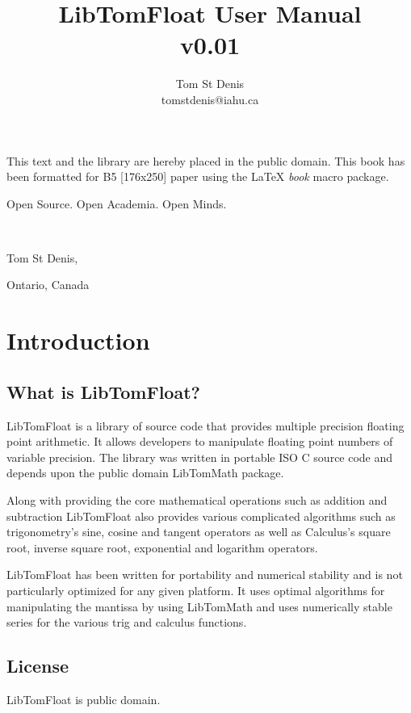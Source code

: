 \documentclass[b5paper]{book}
\begin{document}
\frontmatter
\pagestyle{empty}
\title{LibTomFloat User Manual \\ v0.01}
\author{Tom St Denis \\ tomstdenis@iahu.ca}
\maketitle
This text and the library are hereby placed in the public domain.  This book has been formatted for B5 [176x250] paper using the \LaTeX{} {\em book} 
macro package.

\vspace{10cm}

\begin{flushright}Open Source.  Open Academia.  Open Minds.

\mbox{ }

Tom St Denis,

Ontario, Canada
\end{flushright}

\tableofcontents
\listoffigures
\mainmatter
\pagestyle{headings}
\chapter{Introduction}
\section{What is LibTomFloat?}
LibTomFloat is a library of source code that provides multiple precision floating point arithmetic.  It allows developers to manipulate floating
point numbers of variable precision.  The library was written in portable ISO C source code and depends upon the public domain
LibTomMath package.

Along with providing the core mathematical operations such as addition and subtraction LibTomFloat also provides various complicated algorithms
such as trigonometry's sine, cosine and tangent operators as well as Calculus's square root, inverse square root, exponential and logarithm
operators.  

LibTomFloat has been written for portability and numerical stability and is not particularly optimized for any given platform.  It uses optimal
algorithms for manipulating the mantissa by using LibTomMath and uses numerically stable series for the various trig and calculus functions.

\section{License}
LibTomFloat is public domain.
\end{document}
